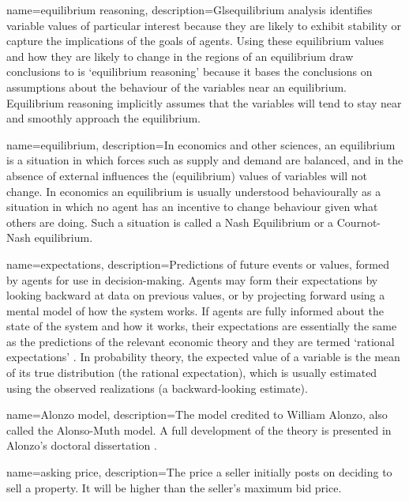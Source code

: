 {
name=equilibrium reasoning,
description={Gls{equilibrium} analysis identifies variable values of particular interest because they are likely to exhibit stability or capture the implications of the goals of agents. Using these equilibrium values and how they are likely to change in the regions of an equilibrium draw conclusions to is `equilibrium reasoning' because it bases the conclusions on assumptions about the behaviour of the variables near an equilibrium. Equilibrium reasoning implicitly  assumes that the variables will tend to stay near and smoothly approach the equilibrium.}
}

{
name=equilibrium,
description={In economics and other sciences, an equilibrium is a situation in which forces such as supply and demand are balanced, and in the absence of external influences the (equilibrium) values of variables will not change. In economics an equilibrium is usually understood behaviourally as a situation in which no agent has an incentive to change behaviour given what others are doing. Such a situation is called a Nash Equilibrium or a Cournot-Nash equilibrium.}
}

{
name=expectations,
description={Predictions of future events or values, formed by agents for use in decision-making. Agents may form their expectations by looking backward at data on previous values, or by projecting forward using a mental model of how the system works. If agents are fully informed about the state of the system and how it works, their expectations are essentially the same as the predictions of the relevant economic theory and they are termed `rational expectations' \cite{muthRationalExpectationsTheory1961}. In probability theory, the expected value of a variable is the mean of its true distribution (the rational expectation), which is usually estimated using the observed realizations (a backward-looking estimate).}
}

{
name=Alonzo model,
description={The model credited to William Alonzo, also called the Alonso-Muth model. A full development of the theory is presented in Alonzo's doctoral dissertation \cite{alonzoTheoryUrbanLand1960}.} %
}

{
name=asking price,
description={The price a seller initially posts on deciding to sell a property. It will be higher than the seller's maximum bid price.}
}

